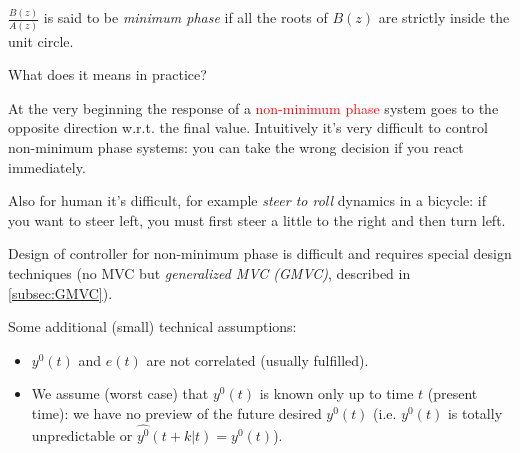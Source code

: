 \begin{remark}
    $\frac{B(z)}{A(z)}$ is said to be \emph{minimum phase} if all the roots of $B(z)$ are strictly inside the unit circle.

    What does it means in practice? 

    \begin{figure}[H]
        \centering
    \end{figure}

    At the very beginning the response of a \textcolor{red}{non-minimum phase} system goes to the opposite direction w.r.t. the final value. Intuitively it's very difficult to control non-minimum phase systems: you can take the wrong decision if you react immediately.

    Also for human it's difficult, for example \emph{steer to roll} dynamics in a bicycle: if you want to steer left, you must first steer a little to the right and then turn left.

    Design of controller for non-minimum phase is difficult and requires special design techniques (no MVC but \emph{generalized MVC (GMVC)}, described in \ref{subsec:GMVC}).
\end{remark}

Some additional (small) technical assumptions:
\begin{itemize}
    \item $y^0(t)$ and $e(t)$ are not correlated (usually fulfilled).
    \item We assume (worst case) that $y^0(t)$ is known only up to time $t$ (present time): we have no preview of the future desired $y^0(t)$ (i.e. $y^0(t)$ is totally unpredictable or $\hat{y^0}(t+k|t) = y^0(t)$).
\end{itemize}

